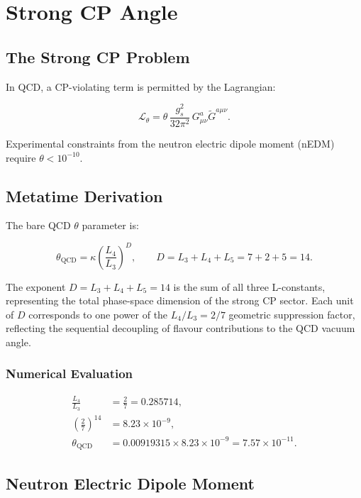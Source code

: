 \chapter{Strong CP Angle}
\label{ch:strong_cp}

\section{The Strong CP Problem}

In QCD, a CP-violating term is permitted by the Lagrangian:

\[
\mathcal{L}_\theta = \theta\,\frac{g_s^2}{32\pi^2}\,G_{\mu\nu}^a\tilde{G}^{a\mu\nu}.
\]

Experimental constraints from the neutron electric dipole moment (nEDM)
require \(\theta < 10^{-10}\).

\section{Metatime Derivation}

The bare QCD \(\theta\) parameter is:

\begin{equation}
\theta_{\text{QCD}} = \kappa\left(\frac{L_4}{L_3}\right)^{\!D},
\qquad D = L_3 + L_4 + L_5 = 7 + 2 + 5 = 14.
\label{eq:theta_qcd}
\end{equation}

The exponent \(D = L_3 + L_4 + L_5 = 14\) is the sum of all three
L-constants, representing the total phase-space dimension of the strong
CP sector.  Each unit of \(D\) corresponds to one power of the
\(L_4/L_3 = 2/7\) geometric suppression factor, reflecting the
sequential decoupling of flavour contributions to the QCD vacuum angle.

\subsection{Numerical Evaluation}

\[
\begin{aligned}
\frac{L_4}{L_3} &= \frac{2}{7} = 0.285714, \\[4pt]
\left(\frac{2}{7}\right)^{14} &= 8.23 \times 10^{-9}, \\[4pt]
\theta_{\text{QCD}} &= 0.00919315 \times 8.23 \times 10^{-9}
                    = 7.57 \times 10^{-11}.
\end{aligned}
\]

\section{Neutron Electric Dipole Moment}

